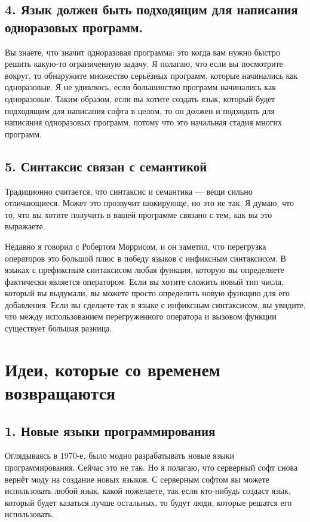 \documentclass[ebook,12pt,oneside,openany]{memoir}
\begin{document}
\subsection{4. Язык должен быть подходящим для написания одноразовых
  программ.}

Вы знаете, что значит одноразовая программа: это когда вам нужно
быстро решить какую-то ограниченную задачу. Я полагаю, что если вы
посмотрите вокруг, то обнаружите множество серьёзных программ, которые
начинались как одноразовые. Я не удивлюсь, если большинство программ
начинались как одноразовые. Таким образом, если вы хотите создать
язык, который будет подходящим для написания софта в целом, то он
должен и подходить для написания одноразовых программ, потому что это
начальная стадия многих программ. \newline

\subsection{5. Синтаксис связан с семантикой}

Традиционно считается, что синтаксис и семантика — вещи сильно
отличающиеся. Может это прозвучит шокирующе, но это не так. Я думаю,
что то, что вы хотите получить в вашей программе связано с тем, как вы
это выражаете. \newline

Недавно я говорил с Робертом Моррисом, и он заметил, что перегрузка
операторов это большой плюс в победу языков с инфиксным синтаксисом. В
языках с префиксным синтаксисом любая функция, которую вы определяете
фактически является оператором. Если вы хотите сложить новый тип
числа, который вы выдумали, вы можете просто определить новую функцию
для его добавления. Если вы сделаете так в языке с инфиксным
синтаксисом, вы увидите, что между использованием перегруженного
оператора и вызовом функции существует большая разница. \newline

\section*{Идеи, которые со временем возвращаются}

\subsection{1. Новые языки программирования}

Оглядываясь в 1970-е, было модно разрабатывать новые языки
программирования. Сейчас это не так. Но я полагаю, что серверный софт
снова вернёт моду на создание новых языков. С серверным софтом вы
можете использовать любой язык, какой пожелаете, так если кто-нибудь
создаст язык, который будет казаться лучше остальных, то будут люди,
которые решатся его использовать. \newline
\end{document}
